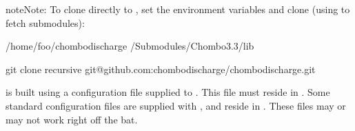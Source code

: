 \documentclass[letterpaper,10pt,english]{sphinxmanual}
\begin{document}
\begin{sphinxadmonition}{note}{Note:}
\sphinxAtStartPar
To clone  directly to , set the environment variables and clone (using  to fetch submodules):

\begin{sphinxVerbatim}[commandchars=\\\{\},formatcom=\scriptsize]
 /home/foo/chombo\PYGZhy{}discharge
 /Submodules/Chombo\PYGZhy{}3.3/lib

git clone \PYGZhy{}\PYGZhy{}recursive git@github.com:chombo\PYGZhy{}discharge/chombo\PYGZhy{}discharge.git 
\end{sphinxVerbatim}
\end{sphinxadmonition}

\sphinxAtStartPar
{} is built using a configuration file supplied to .
This file must reside in .
Some standard configuration files are supplied with , and reside in .
These files may or may not work right off the bat.
\end{document}
